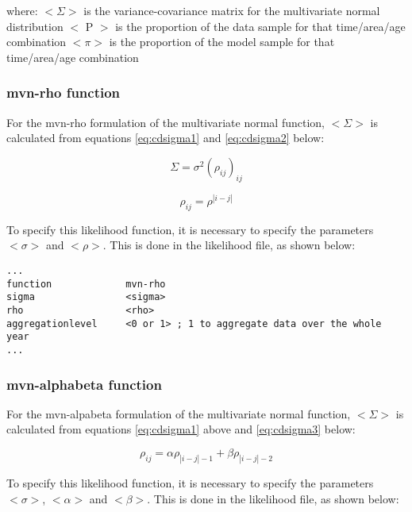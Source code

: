 \documentclass [a4paper, 10pt]{book}
\begin{document}
where:\newline
$<\Sigma>$ is the variance-covariance matrix for the multivariate normal distribution\newline
$<$ P $>$ is the proportion of the data sample for that time/area/age combination\newline
$<\pi>$ is the proportion of the model sample for that time/area/age combination

\subsubsection{mvn-rho function}
For the mvn-rho formulation of the multivariate normal function, $<\Sigma>$ is calculated from equations \ref{eq:cdsigma1}  and \ref{eq:cdsigma2} below:

\begin{equation}\label{eq:cdsigma1}
\Sigma = \sigma^2(\rho_{ij})_{ij}
\end{equation}

\begin{equation}\label{eq:cdsigma2}
\rho_{ij} = \rho^{|i-j|}
\end{equation}

To specify this likelihood function, it is necessary to specify the parameters $<\sigma>$ and $<\rho>$.  This is done in the likelihood file, as shown below:

{\small\begin{verbatim}
...
function             mvn-rho
sigma                <sigma>
rho                  <rho>
aggregationlevel     <0 or 1> ; 1 to aggregate data over the whole year
...
\end{verbatim}}

\subsubsection{mvn-alphabeta function}
For the mvn-alpabeta formulation of the multivariate normal function, $<\Sigma>$ is calculated from equations \ref{eq:cdsigma1} above and \ref{eq:cdsigma3} below:

\begin{equation}\label{eq:cdsigma3}
\rho_{ij} = \alpha \rho_{|i-j|-1} + \beta \rho_{|i-j|-2}
\end{equation}

To specify this likelihood function, it is necessary to specify the parameters $<\sigma>$, $<\alpha>$ and $<\beta>$.  This is done in the likelihood file, as shown below:
\end{document}
